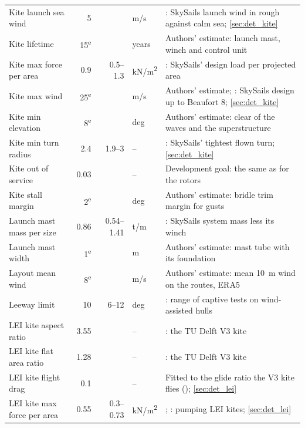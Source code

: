 \begin{longtable}{@{}>{\raggedright\arraybackslash}p{3.4cm}rr>{\raggedright\arraybackslash}p{1.4cm}>{\raggedright\arraybackslash}p{5.8cm}@{}}
Kite launch sea wind & \num{5} &  & m/s & \citet{paulig2013}: SkySails launch wind in rough against calm sea; \cref{sec:det_kite} \\
Kite lifetime & \num{15}\textsuperscript{e} &  & years & Authors' estimate: launch mast, winch and control unit \\
Kite max force per area & \num{0.9} & \num{0.5}--\num{1.3} & kN/m\textsuperscript{2} & \citet[p. 561]{paulig2013}: SkySails' design load per projected area \\
Kite max wind & \num{25}\textsuperscript{e} &  & m/s & Authors' estimate; \citet{noaa2009}: SkySails design up to Beaufort 8; \cref{sec:det_kite} \\
Kite min elevation & \num{8}\textsuperscript{e} &  & deg & Authors' estimate: clear of the waves and the superstructure \\
Kite min turn radius & \num{2.4} & \num{1.9}--\num{3} & -- & \citet[Eq. 7]{erhard2013}: SkySails' tightest flown turn; \cref{sec:det_kite} \\
Kite out of service & \num{0.03} &  & -- & Development goal: the same as for the rotors \\
Kite stall margin & \num{2}\textsuperscript{e} &  & deg & Authors' estimate: bridle trim margin for gusts \\
Launch mast mass per size & \num{0.86} & \num{0.54}--\num{1.41} & t/m & \citet[Annex A.4]{cedelft2016}: SkySails system mass less its winch \\
Launch mast width & \num{1}\textsuperscript{e} &  & m & Authors' estimate: mast tube with its foundation \\
Layout mean wind & \num{8}\textsuperscript{e} &  & m/s & Authors' estimate: mean 10~m wind on the routes, ERA5 \\
Leeway limit & \num{10} & \num{6}--\num{12} & deg & \citet{tillig2020}: range of captive tests on wind-assisted hulls \\
LEI kite aspect ratio & \num{3.55} &  & -- & \citet[Table 1]{poland2025}: the TU Delft V3 kite \\
LEI kite flat area ratio & \num{1.28} &  & -- & \citet[Table 1]{poland2025}: the TU Delft V3 kite \\
LEI kite flight drag & \num{0.1} &  & -- & Fitted to the glide ratio the V3 kite flies (\citealp{vandervlugt2019}); \cref{sec:det_lei} \\
LEI kite max force per area & \num{0.55} & \num{0.3}--\num{0.73} & kN/m\textsuperscript{2} & \citet{kitepower2024}; \citet[Table 16.1]{faggiani2018}: pumping LEI kites; \cref{sec:det_lei} \\

\end{longtable}
